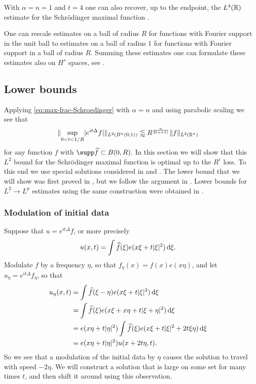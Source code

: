 With $\alpha=n=1$ and $t=4$ one can also recover, up to the endpoint, the $L^{4}(\mathbb{R})$ estimate for the Schr\"odinger maximal function \cite{MR1101221}.

One can rescale estimates on a ball of radius $R$ for functions with Fourier support in the unit ball to estimates on a ball of radius $1$ for functions with Fourier support in a ball of radius $R$.
Summing these estimates one can formulate these estimates also on $H^{s}$ spaces, see \cite{MR2264734}.

\subsection{Lower bounds}
Applying \eqref{eq:max-frac-Schroedinger} with $\alpha=n$ and using parabolic scaling we see that
\begin{equation}
\label{eq:max-Lebesgue-Schroedinger}
\lVert \sup_{0 < t < 1/R} \lvert e^{it\Delta} f\rvert \rVert_{L^{2}(B^{n}(0,1))}
\lessapprox R^{\frac{n}{2(n+1)}} \lVert f\rVert_{L^{2}(\mathbb{R}^{n})}
\end{equation}
for any function $f$ with $\supp \widehat{f} \subset B(0,R)$.
In this section we will show that this $L^{2}$ bound for the Schr\"odinger maximal function is optimal up to the $R^{\epsilon}$ loss.
To this end we use special solutions considered in \cite{MR2354692} and \cite{MR3613507}.
The lower bound that we will show was first proved in \cite{MR3574661}, but we follow the argument in \cite{arxiv:1703.01360}.
Lower bounds for $L^{2}\to L^{p}$ estimates using the same construction were obtained in \cite{arxiv:1902.01430}.

\subsubsection{Modulation of initial data}
Suppose that $u = e^{it\Delta} f$, or more precisely
\[
u(x,t) = \int \widehat{f}(\xi) e(x\xi + t \lvert\xi\rvert^{2}) \mathop{}\!\mathrm{d}\xi.
\]
Modulate $f$ by a frequency $\eta$, so that $f_{\eta}(x) = f(x) e(x\eta)$, and let $u_{\eta} = e^{it\Delta} f_{\eta}$, so that
\begin{align*}
u_{\eta}(x,t)
&=
\int \widehat{f}(\xi-\eta) e(x\xi + t \lvert\xi\rvert^{2}) \mathop{}\!\mathrm{d}\xi
\\ &=
\int \widehat{f}(\xi) e(x\xi+x\eta + t \lvert\xi+\eta\rvert^{2}) \mathop{}\!\mathrm{d}\xi
\\ &=
e(x\eta + t\lvert\eta\rvert^{2})\int \widehat{f}(\xi) e(x\xi + t \lvert\xi\rvert^{2} + 2 t \xi\eta) \mathop{}\!\mathrm{d}\xi
\\ &=
e(x\eta + t\lvert\eta\rvert^{2}) u(x+2t\eta,t).
\end{align*}
So we see that a modulation of the initial data by $\eta$ causes the solution to travel with speed $-2\eta$.
We will construct a solution that is large on some set for many times $t$, and then shift it around using this observation.

